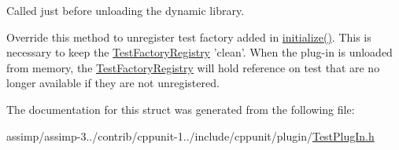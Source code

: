 Called just before unloading the dynamic library. 

Override this method to unregister test factory added in \hyperlink{struct_cpp_unit_test_plug_in_aec670330e7fced26c2a66b1dcd56edc0}{initialize()}. This is necessary to keep the \hyperlink{class_test_factory_registry}{Test\+Factory\+Registry} 'clean'. When the plug-\/in is unloaded from memory, the \hyperlink{class_test_factory_registry}{Test\+Factory\+Registry} will hold reference on test that are no longer available if they are not unregistered. 

The documentation for this struct was generated from the following file\+:\begin{DoxyCompactItemize}
\item 
assimp/assimp-\/3../contrib/cppunit-\/1../include/cppunit/plugin/\hyperlink{assimp_2assimp-3_81_81_2contrib_2cppunit-1_812_81_2include_2cppunit_2plugin_2_test_plug_in_8h}{Test\+Plug\+In.\+h}\end{DoxyCompactItemize}
